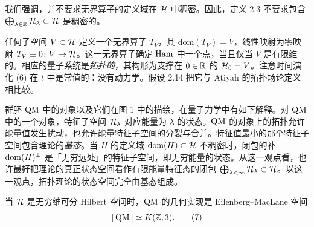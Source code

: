 我们强调，并不要求无界算子的定义域在 $\mathcal{H}$ 中稠密。因此，定义 2.3 不要求包含 $\bigoplus_{\lambda\in\mathbb{R}}\mathcal{H}_\lambda\subset\mathcal{H}$ 是稠密的。

\begin{example}[2.5（拓扑场论）]
任何子空间 $V\subset\mathcal{H}$ 定义一个无界算子 $T_V$，其 $\mathrm{dom}(T_V)=V$，线性映射为零映射 $T_V\equiv 0\colon V\to\mathcal{H}$。这一无界算子确定 $\operatorname{Ham}$ 中一个点，当且仅当 $V$ 是有限维的。相应的量子系统是\emph{拓扑的}，其构形为支撑在 $0\in\mathbb{R}$ 的 $\mathcal{H}_0=V$。注意时间演化 (6) 在 $t$ 中是常值的：没有动力学。假设 2.14 把它与 Atiyah 的拓扑场论定义相比较。
\end{example}


\begin{remark}[2.6]
群胚 $\operatorname{QM}$ 中的对象以及它们在图 1 中的描绘，在量子力学中有如下解释。对 $\operatorname{QM}$ 中的一个对象，特征子空间 $\mathcal{H}_\lambda$ 对应能量为 $\lambda$ 的状态。$\operatorname{QM}$ 的对象上的拓扑允许能量值发生扰动，也允许能量特征子空间的分裂与合并。特征值最小的那个特征子空间包含理论的\emph{基态}。当 $H$ 的定义域 $\mathrm{dom}(H)\subset\mathcal{H}$ 不稠密时，闭包的补 $\mathrm{dom}(H)^{\perp}$ 是「无穷远处」的特征子空间，即无穷能量的状态。从这一观点看，也许最好把理论的真正状态空间看作有限能量特征态的闭包 $\bigoplus_{\lambda<\infty}\mathcal{H}_\lambda\subset\mathcal{H}$。以这一观点，拓扑理论的状态空间完全由基态组成。
\end{remark}

\begin{proposition}[2.7（{[HST10, §6]} {[ST04, §3.1]}）]
当 $\mathcal{H}$ 是无穷维可分 Hilbert 空间时，$\operatorname{QM}$ 的几何实现是 Eilenberg–MacLane 空间
\begin{equation}
|\operatorname{QM}|\simeq K(\mathbb{Z},3).
\tag{7}
\end{equation}
\end{proposition}

